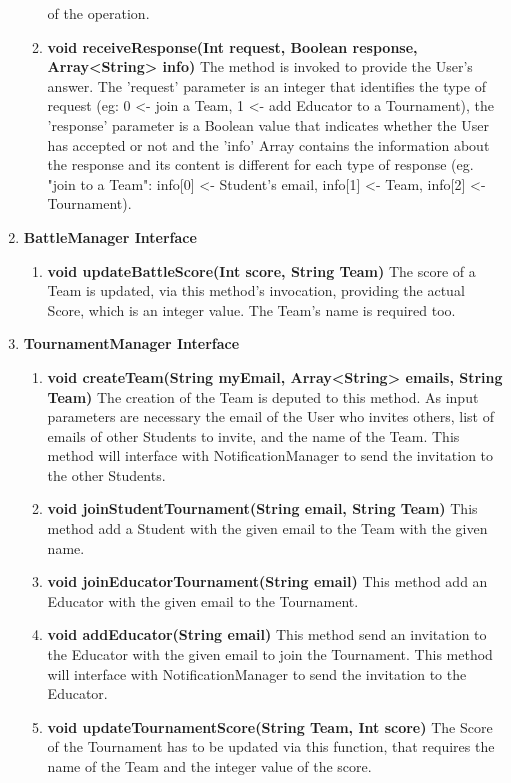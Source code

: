 \begin{enumerate}
\begin{enumerate}[label=$\bullet$]
            of the operation.
            \item \textbf{void receiveResponse(Int request, Boolean response, Array<String> info)} The method is invoked to provide the User's answer. The 'request' parameter is an integer that identifies the type of request 
            (eg: 0 <- join a Team, 1 <- add Educator to a Tournament), the 'response' parameter is a Boolean value that indicates whether the User has accepted or not and the 'info' Array contains the information about the response 
            and its content is different for each type of response (eg. "join to a Team": info[0] <- Student's email, info[1] <- Team, info[2] <- Tournament).
        \end{enumerate}
    \item \textbf{BattleManager Interface}
        \begin{enumerate}[label=$\bullet$]
            \item \textbf{void updateBattleScore(Int score, String Team)} The score of a Team is updated, via this method's invocation, providing the actual Score, which is an integer value. The Team's name is required too.
        \end{enumerate}
    \item \textbf{TournamentManager Interface}
        \begin{enumerate}[label=$\bullet$]
        \item \textbf{void createTeam(String myEmail, Array<String> emails, String Team)} The creation of the Team is deputed to this method. As input parameters are necessary the email of the User who invites others, list of emails 
        of other Students to invite, and the name of the Team. This method will interface with NotificationManager to send the invitation to the other Students. 
        \item \textbf{void joinStudentTournament(String email, String Team)} This method add a Student with the given email to the Team with the given name.
        \item \textbf{void joinEducatorTournament(String email)} This method add an Educator with the given email to the Tournament.
        \item \textbf{void addEducator(String email)} This method send an invitation to the Educator with the given email to join the Tournament. This method will interface with NotificationManager to send the invitation to the Educator.
        \item \textbf{void updateTournamentScore(String Team, Int score)} The Score of the Tournament has to be updated via this function, that requires the name of the Team and the integer value of the score.

\end{enumerate}
\end{enumerate}
